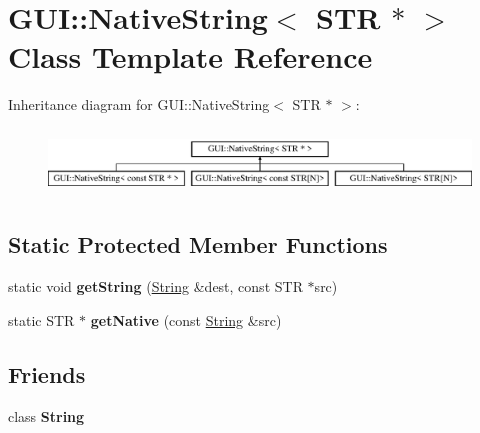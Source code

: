 \hypertarget{classGUI_1_1NativeString_3_01STR_01_5_01_4}{\section{G\-U\-I\-:\-:Native\-String$<$ S\-T\-R $\ast$ $>$ Class Template Reference}
\label{classGUI_1_1NativeString_3_01STR_01_5_01_4}
}
Inheritance diagram for G\-U\-I\-:\-:Native\-String$<$ S\-T\-R $\ast$ $>$\-:\begin{figure}[H]
\begin{center}
\leavevmode
\includegraphics[height=1.786284cm]{classGUI_1_1NativeString_3_01STR_01_5_01_4}
\end{center}
\end{figure}
\subsection*{Static Protected Member Functions}
\begin{DoxyCompactItemize}
\item 
\hypertarget{classGUI_1_1NativeString_3_01STR_01_5_01_4_a9df8f587a554e692fae6dc7aa54a1e45}{static void {\bfseries get\-String} (\hyperlink{classGUI_1_1String}{String} \&dest, const S\-T\-R $\ast$src)}\label{classGUI_1_1NativeString_3_01STR_01_5_01_4_a9df8f587a554e692fae6dc7aa54a1e45}

\item 
\hypertarget{classGUI_1_1NativeString_3_01STR_01_5_01_4_ab20ab6f81cc8b4110e42fada79b3149f}{static S\-T\-R $\ast$ {\bfseries get\-Native} (const \hyperlink{classGUI_1_1String}{String} \&src)}\label{classGUI_1_1NativeString_3_01STR_01_5_01_4_ab20ab6f81cc8b4110e42fada79b3149f}

\end{DoxyCompactItemize}
\subsection*{Friends}
\begin{DoxyCompactItemize}
\item 
\hypertarget{classGUI_1_1NativeString_3_01STR_01_5_01_4_a7fb804f7dc96dd9f705c84095f37f1ca}{class {\bfseries String}}\label{classGUI_1_1NativeString_3_01STR_01_5_01_4_a7fb804f7dc96dd9f705c84095f37f1ca}

\end{DoxyCompactItemize}


